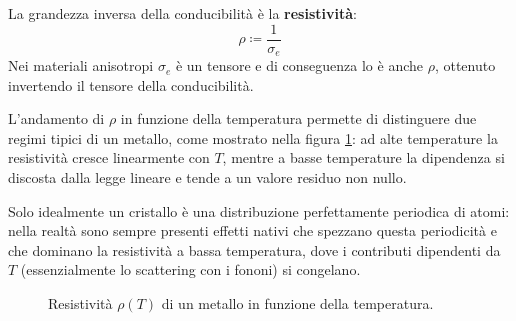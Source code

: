La grandezza inversa della conducibilità è la \textbf{resistività}:
\begin{equation}
    \rho \coloneqq \frac{1}{\sigma_e}
\end{equation}
Nei materiali anisotropi \( \sigma_e \) è un tensore e di conseguenza lo è anche \( \rho \), ottenuto invertendo il tensore della conducibilità.

L'andamento di \( \rho \) in funzione della temperatura permette di distinguere due regimi tipici di un metallo, come mostrato nella figura \ref{fig:resistivita_metallo}: ad alte temperature la resistività cresce linearmente con \( T \), mentre a basse temperature la dipendenza si discosta dalla legge lineare e tende a un valore residuo non nullo.

Solo idealmente un cristallo è una distribuzione perfettamente periodica di atomi: nella realtà sono sempre presenti effetti nativi che spezzano questa periodicità e che dominano la resistività a bassa temperatura, dove i contributi dipendenti da \( T \) (essenzialmente lo scattering con i fononi) si congelano.

\begin{figure}[H]
    \centering
    \caption{Resistività \( \rho(T) \) di un metallo in funzione della temperatura.}
    \label{fig:resistivita_metallo}
\end{figure}

